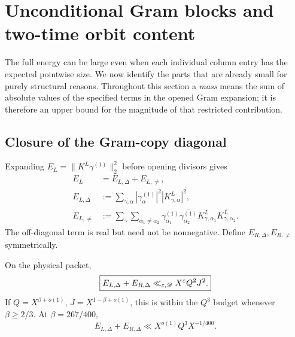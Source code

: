 \section{Unconditional Gram blocks and two-time orbit content}
\label{sec:tpc34-unconditional-blocks}

The full energy can be large even when each individual column entry has
the expected pointwise size.  We now identify the parts that are already
small for purely structural reasons.  Throughout this section a
\emph{mass} means the sum of absolute values of the specified terms in
the opened Gram expansion; it is therefore an upper bound for the
magnitude of that restricted contribution.

\subsection{Closure of the Gram-copy diagonal}

Expanding \(E_L=\|K^L\gamma^{(1)}\|_2^2\) before opening divisors gives
\begin{align}
 E_L
 &=E_{L,\Delta}+E_{L,\ne},
 \label{eq:tpc34-Gram-copy-split}\\
 E_{L,\Delta}
 &:=
 \sum_{\gamma,\alpha}|\gamma_\alpha^{(1)}|^2
 |K^L_{\gamma,\alpha}|^2,
 \label{eq:tpc34-left-Gram-copy-diagonal}\\
 E_{L,\ne}
 &:=
 \sum_\gamma\sum_{\alpha_1\ne\alpha_2}
 \gamma_{\alpha_1}^{(1)}
 \overline{\gamma_{\alpha_2}^{(1)}}
 K^L_{\gamma,\alpha_1}
 \overline{K^L_{\gamma,\alpha_2}}.
 \label{eq:tpc34-left-Gram-copy-offdiagonal}
\end{align}
The off-diagonal term is real but need not be nonnegative.  Define
\(E_{R,\Delta},E_{R,\ne}\) symmetrically.

\begin{theorem}
\label{thm:tpc34-row-diagonal}
On the physical packet,
\begin{equation}
 \boxed{
 E_{L,\Delta}+E_{R,\Delta}
 \ll_{\varepsilon,\mathscr D}X^\varepsilon Q^2J^2.}
 \label{eq:tpc34-row-diagonal-bound}
\end{equation}
If \(Q=X^{\beta+o(1)}\), \(J=X^{1-\beta+o(1)}\), this is within the
\(Q^3\) budget whenever \(\beta\ge2/3\).  At
\(\beta=267/400\),
\begin{equation}
 E_{L,\Delta}+E_{R,\Delta}
 \ll X^{o(1)}Q^3X^{-1/400}.
 \label{eq:tpc34-row-diagonal-margin}
\end{equation}
\end{theorem}

